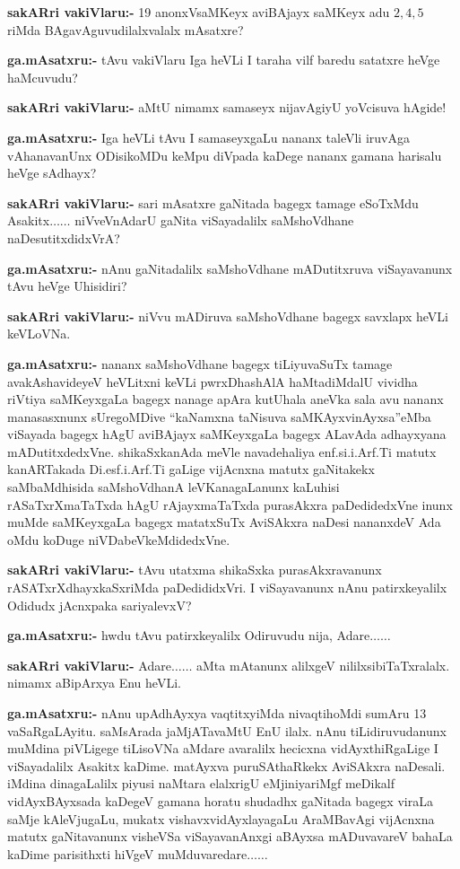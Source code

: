 \smallskip
\noindent
\textbf{sakARri vakiVlaru:-} {\rm 19} anonxVsaMKeyx aviBAjayx saMKeyx adu $2, 4, 5$ riMda BAgavAguvudilalxvalalx mAsatxre?

\smallskip
\noindent
\textbf{ga.mAsatxru:-} tAvu vakiVlaru Iga heVLi I taraha vilf baredu satatxre heVge haMcuvudu?

\smallskip
\noindent
\textbf{sakARri vakiVlaru:-} aMtU nimamx samaseyx nijavAgiyU yoVcisuva hAgide!

\smallskip
\noindent
\textbf{ga.mAsatxru:-} Iga heVLi tAvu I samaseyxgaLu nananx taleVli iruvAga vAhanavanUnx ODisikoMDu keMpu diVpada kaDege nananx gamana harisalu heVge sAdhayx?

\smallskip
\noindent
\textbf{sakARri vakiVlaru:-} sari mAsatxre gaNitada bagegx tamage eSoTxMdu Asakitx$\ldots\ldots$ niVveVnAdarU gaNita viSayadalilx saMshoVdhane naDesutitxdidxVrA?

\smallskip
\noindent
\textbf{ga.mAsatxru:-} nAnu gaNitadalilx saMshoVdhane mADutitxruva viSayavanunx tAvu heVge Uhisidiri?

\smallskip
\noindent
\textbf{sakARri vakiVlaru:-} niVvu mADiruva saMshoVdhane bagegx savxlapx heVLi keVLoVNa.

\smallskip
\noindent
\textbf{ga.mAsatxru:-} nananx saMshoVdhane bagegx tiLiyuvaSuTx tamage avakAshavideyeV heVLitxni keVLi pwrxDhashAlA haMtadiMdalU vividha riVtiya saMKeyxgaLa bagegx nanage apAra kutUhala aneVka sala avu nananx manasasxnunx sUregoMDive ``kaNamxna taNisuva saMKAyxvinAyxsa''eMba viSayada bagegx hAgU aviBAjayx saMKeyxgaLa bagegx ALavAda adhayxyana mADutitxdedxVne. shikaSxkanAda meVle navadehaliya enf.si.i.Arf.Ti matutx kanARTakada Di.esf.i.Arf.Ti gaLige vijAcnxna matutx gaNitakekx saMbaMdhisida saMshoVdhanA leVKanagaLanunx kaLuhisi rASaTxrXmaTaTxda hAgU rAjayxmaTaTxda purasAkxra paDedidedxVne inunx muMde saMKeyxgaLa bagegx matatxSuTx AviSAkxra naDesi nananxdeV Ada oMdu koDuge niVDabeVkeMdidedxVne.

\smallskip
\noindent
\textbf{sakARri vakiVlaru:-} tAvu utatxma shikaSxka purasAkxravanunx rASATxrXdhayxkaSxriMda paDedididxVri. I viSayavanunx nAnu patirxkeyalilx Odidudx jAcnxpaka sariyalevxV?

\smallskip
\noindent
\textbf{ga.mAsatxru:-} hwdu tAvu patirxkeyalilx Odiruvudu nija, Adare$\ldots\ldots$

\smallskip
\noindent
\textbf{sakARri vakiVlaru:-} Adare$\ldots\ldots$ aMta mAtanunx alilxgeV nililxsibiTaTxralalx. nimamx aBipArxya Enu heVLi.

\smallskip
\noindent
\textbf{ga.mAsatxru:-} nAnu upAdhAyxya vaqtitxyiMda nivaqtihoMdi sumAru {\rm 13} vaSaRgaLAyitu. saMsArada jaMjATavaMtU EnU ilalx. nAnu tiLidiruvudanunx muMdina piVLigege tiLisoVNa aMdare avaralilx hecicxna vidAyxthiRgaLige I viSayadalilx Asakitx kaDime. matAyxva puruSAthaRkekx AviSAkxra naDesali. iMdina dinagaLalilx piyusi naMtara elalxrigU eMjiniyariMgf meDikalf vidAyxBAyxsada kaDegeV gamana horatu shudadhx gaNitada bagegx viraLa saMje kAleVjugaLu, mukatx vishavxvidAyxlayagaLu AraMBavAgi vijAcnxna matutx gaNitavanunx visheVSa viSayavanAnxgi aBAyxsa mADuvavareV bahaLa kaDime parisithxti hiVgeV muMduvaredare$\ldots\ldots$

